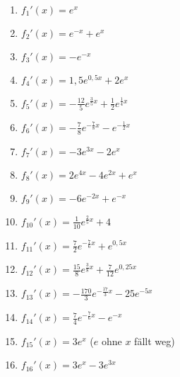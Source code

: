 \begin{Answer}[ref=efktAblA1]\\
	\begin{minipage}{\textwidth}
		\begin{minipage}{0.5\textwidth}
			\begin{enumerate}[label=\alph*)]
				\item \(f_1'(x)=e^x\)
				\item \(f_2'(x)=e^{-x}+e^x\)
				\item \(f_3'(x)=-e^{-x}\)
				\item \(f_4'(x)=1,5e^{0,5x}+2e^x\)
				\item \(f_5'(x)=-\frac{12}{5}e^{\frac{3}{5}x}+\frac{1}{2}e^{\frac{1}{4}x}\)
				\item \(f_6'(x)=-\frac{7}{8}e^{-\frac{7}{8}x}-e^{-\frac{1}{2}x}\)
				\item \(f_7'(x)=-3e^{3x}-2e^{x}\)
				\item \(f_8'(x)=2e^{4x}-4e^{2x}+e^x\)
			\end{enumerate}
		\end{minipage}
		\begin{minipage}{0.5\textwidth}
			\begin{enumerate}[label=\alph*)]
				\setcounter{enumi}{8}
				\item \(f_9'(x)=-6e^{-2x}+e^{-x}\)
				\item \(f_{10}'(x)=\frac{1}{10}e^{\frac{2}{5}x}+4\)
				\item \(f_{11}'(x)=\frac{7}{2}e^{-\frac{7}{6}x}+e^{0,5x}\)
				\item \(f_{12}'(x)=\frac{15}{8}e^{\frac{3}{8}x}+\frac{7}{12}e^{0,25x}\)
				\item \(f_{13}'(x)=-\frac{170}{3}e^{-\frac{17}{3}x}-25e^{-5x}\)
				\item \(f_{14}'(x)=\frac{7}{4}e^{-\frac{7}{6}x}-e^{-x}\)
				\item \(f_{15}'(x)=3e^x\) (\(e\) ohne \(x\) fällt weg)
				\item \(f_{16}'(x)=3e^x-3e^{3x}\)
			\end{enumerate}
		\end{minipage}
	\end{minipage}\\  \\
\end{Answer}